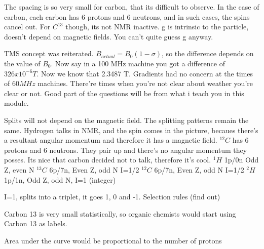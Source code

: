 		The spacing is so very small for carbon, that its difficult to observe. In the case of carbon, each carbon has 6 protons and 6 neutrons, and in such cases, the spins cancel out. For $C^13$ though, its not NMR inactive. g is intrinsic to the particle, doesn't depend on magnetic fields. You can't quite guess g anyway. 

		TMS concept was reiterated. $B_{actual}=B_0(1-\sigma)$, so the difference depends on the value of $B_0$. Now say in a 100 MHz machine you got a difference of $326x10^{-6}T$.  Now we know that 2.3487 T. Gradients had no concern at the times of $60 MHz$ machines. There're times when you're not clear about weather you're clear or not. Good part of the questions will be from what i teach you in this module.

		Splits will not depend on the magnetic field. The splitting patterns remain the same.
		Hydrogen talks in NMR, and the spin comes in the picture, becaues there's a resultant angular momentum and therefore it has a magnetic field. $^{12}C$ has 6 protons and 6 neutrons. They pair up and there's no angular momentum they posses. Its nice that carbon decided not to talk, therefore it's cool. 
		$^1H$ 1p/0n Odd Z, even N
		$^{13}C$ 6p/7n, Even Z, odd N I=1/2
		$^{12}C$ 6p/7n, Even Z, odd N I=1/2
		$^2H$ 1p/1n, Odd Z, odd N, I=1 (integer)

		I=1, splits into a triplet, it goes 1, 0 and -1. Selection rules (find out)

		Carbon 13 is very small statistically, so organic chemists would start using Carbon 13 as labels.

		Area under the curve would be proportional to the number of protons

